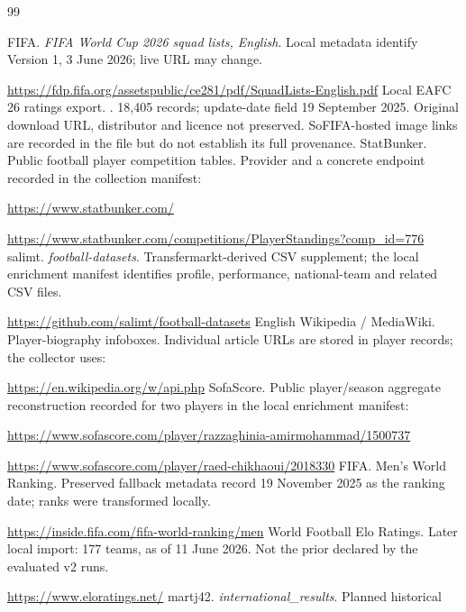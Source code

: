 \clearpage
{}
\renewcommand{\refname}{References and Data Sources}
\begin{thebibliography}{99}
\small\raggedright
\setlength{\itemsep}{3pt}
\setlength{\parskip}{1pt}
\setlength{\parsep}{0pt}
 FIFA. \emph{FIFA World Cup 2026 squad lists, English}.
Local metadata identify Version 1, 3 June 2026; live URL may change.
\par\url{https://fdp.fifa.org/assetspublic/ce281/pdf/SquadLists-English.pdf}
 Local EAFC 26 ratings export. .
18,405 records; update-date field 19 September 2025. Original download URL,
distributor and licence not preserved. SoFIFA-hosted image links are recorded
in the file but do not establish its full provenance.
 StatBunker. Public football player competition tables.
Provider and a concrete endpoint recorded in the collection manifest:
\par\url{https://www.statbunker.com/}
\par\url{https://www.statbunker.com/competitions/PlayerStandings?comp_id=776}
 salimt. \emph{football-datasets}. Transfermarkt-derived
CSV supplement; the local enrichment manifest identifies profile, performance,
national-team and related CSV files.
\par\url{https://github.com/salimt/football-datasets}
 English Wikipedia / MediaWiki. Player-biography infoboxes.
Individual article URLs are stored in player records; the collector uses:
\par\url{https://en.wikipedia.org/w/api.php}
 SofaScore. Public player/season aggregate reconstruction
recorded for two players in the local enrichment manifest:
\par\url{https://www.sofascore.com/player/razzaghinia-amirmohammad/1500737}
\par\url{https://www.sofascore.com/player/raed-chikhaoui/2018330}
 FIFA. Men's World Ranking. Preserved fallback metadata
record 19 November 2025 as the ranking date; ranks were transformed locally.
\par\url{https://inside.fifa.com/fifa-world-ranking/men}
 World Football Elo Ratings. Later local import: 177 teams,
as of 11 June 2026. Not the prior declared by the evaluated v2 runs.
\par\url{https://www.eloratings.net/}
 martj42. \emph{international\_results}. Planned historical

\end{thebibliography}
